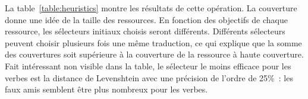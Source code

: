 
La table~\ref{table:heuristics} montre les résultats de cette opération. La couverture donne une idée de la taille des ressources. En fonction des objectifs de chaque ressource, les sélecteurs initiaux choisis seront différents. Différents sélecteurs peuvent choisir plusieurs fois une même traduction, ce qui explique que la somme des couvertures soit supérieure à la couverture de la ressource à haute couverture. Fait intéressant non visible dans la table, le sélecteur le moins efficace pour les verbes est la distance de Levenshtein avec une précision de l'ordre de 25\%~: les faux amis semblent être plus nombreux pour les verbes.

